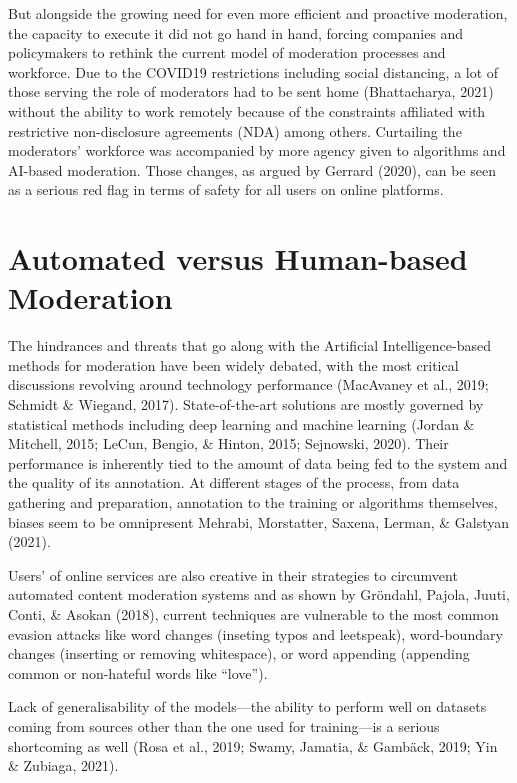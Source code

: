 \documentclass[
  10pt,
  dvipsnames,enabledeprecatedfontcommands]{scrartcl}
\begin{document}
But alongside the growing need for even more efficient and proactive
moderation, the capacity to execute it did not go hand in hand, forcing
companies and policymakers to rethink the current model of moderation
processes and workforce. Due to the COVID19 restrictions including
social distancing, a lot of those serving the role of moderators had to
be sent home (Bhattacharya, 2021) without the ability to work remotely
because of the constraints affiliated with restrictive non-disclosure
agreements (NDA) among others. Curtailing the moderators' workforce was
accompanied by more agency given to algorithms and AI-based moderation.
Those changes, as argued by Gerrard (2020), can be seen as a serious red
flag in terms of safety for all users on online platforms.

\hypertarget{automated-versus-human-based-moderation}{%
\section{Automated versus Human-based
Moderation}\label{automated-versus-human-based-moderation}}

The hindrances and threats that go along with the Artificial
Intelligence-based methods for moderation have been widely debated, with
the most critical discussions revolving around technology performance
(MacAvaney et al., 2019; Schmidt \& Wiegand, 2017). State-of-the-art
solutions are mostly governed by statistical methods including deep
learning and machine learning (Jordan \& Mitchell, 2015; LeCun, Bengio,
\& Hinton, 2015; Sejnowski, 2020). Their performance is inherently tied
to the amount of data being fed to the system and the quality of its
annotation. At
different stages of the process, from data gathering and preparation,
annotation to the training or algorithms themselves, biases seem to be
omnipresent Mehrabi, Morstatter, Saxena, Lerman, \& Galstyan (2021).

Users' of online
services are also creative in their strategies to circumvent automated
content moderation systems and as shown by Gröndahl, Pajola, Juuti,
Conti, \& Asokan (2018), current techniques are vulnerable to the most
common evasion attacks like word changes (inseting typos and leetspeak),
word-boundary changes (inserting or removing whitespace), or word
appending (appending common or non-hateful words like ``love'').

Lack of
generalisability of the models---the ability to perform well on datasets
coming from sources other than the one used for training---is a serious
shortcoming as well (Rosa et al., 2019; Swamy, Jamatia, \& Gambäck,
2019; Yin \& Zubiaga, 2021).
\end{document}
